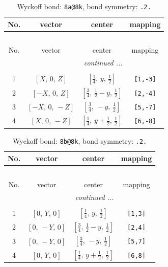 \documentclass[fleqn,8pt]{jsarticle}
\begin{document}
\begin{longtable}{cccc}
\caption{Wyckoff bond: {\tt 8a@8k}, bond symmetry: {\tt .2.}}
 \\
 \hline \hline
No. & vector & center & mapping \\ \hline \endfirsthead

\multicolumn{3}{l}{\tablename\ \thetable{}} \\
 \hline \hline
No. & vector & center & mapping \\ \hline \endhead

 \hline \hline
\multicolumn{3}{r}{\footnotesize\it continued ...} \\ \endfoot

 \hline \hline
\multicolumn{3}{r}{} \\ \endlastfoot

1 & $\left[ X,\, 0,\, Z \right]$ & $\left[ \frac{1}{4},\, y,\, \frac{1}{2} \right]$ & {\tt [1,-3]} \\ \hline
2 & $\left[ - X,\, 0,\, Z \right]$ & $\left[ \frac{3}{4},\, \frac{1}{2} - y,\, \frac{1}{2} \right]$ & {\tt [2,-4]} \\ \hline
3 & $\left[ - X,\, 0,\, - Z \right]$ & $\left[ \frac{3}{4},\, - y,\, \frac{1}{2} \right]$ & {\tt [5,-7]} \\ \hline
4 & $\left[ X,\, 0,\, - Z \right]$ & $\left[ \frac{1}{4},\, y + \frac{1}{2},\, \frac{1}{2} \right]$ & {\tt [6,-8]} \\
\end{longtable}
\renewcommand{\arraystretch}{1.2}
\begin{longtable}{cccc}
\caption{Wyckoff bond: {\tt 8b@8k}, bond symmetry: {\tt .2.}}
 \\
 \hline \hline
No. & vector & center & mapping \\ \hline \endfirsthead

\multicolumn{3}{l}{\tablename\ \thetable{}} \\
 \hline \hline
No. & vector & center & mapping \\ \hline \endhead

 \hline \hline
\multicolumn{3}{r}{\footnotesize\it continued ...} \\ \endfoot

 \hline \hline
\multicolumn{3}{r}{} \\ \endlastfoot

1 & $\left[ 0,\, Y,\, 0 \right]$ & $\left[ \frac{1}{4},\, y,\, \frac{1}{2} \right]$ & {\tt [1,3]} \\ \hline
2 & $\left[ 0,\, - Y,\, 0 \right]$ & $\left[ \frac{3}{4},\, \frac{1}{2} - y,\, \frac{1}{2} \right]$ & {\tt [2,4]} \\ \hline
3 & $\left[ 0,\, - Y,\, 0 \right]$ & $\left[ \frac{3}{4},\, - y,\, \frac{1}{2} \right]$ & {\tt [5,7]} \\ \hline
4 & $\left[ 0,\, Y,\, 0 \right]$ & $\left[ \frac{1}{4},\, y + \frac{1}{2},\, \frac{1}{2} \right]$ & {\tt [6,8]} \\
\end{longtable}
\end{document}
